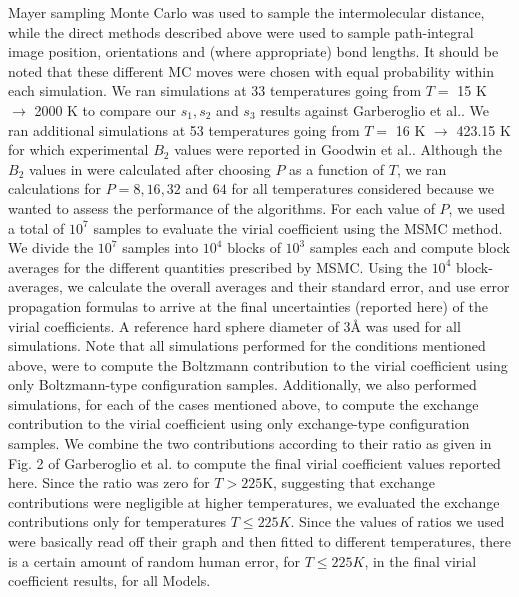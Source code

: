         Mayer sampling Monte Carlo was used to sample the intermolecular distance, while the direct methods described above were used to sample path-integral image position, orientations and (where appropriate) bond lengths. It should be noted that these different MC moves were chosen with equal probability within each simulation. We ran simulations at 33 temperatures going from $T =$ 15 K $\to$ 2000 K to compare our $s_1, s_2$ and $s_3$ results against Garberoglio et al.\cite{Garberoglio2014}. We ran additional simulations at 53 temperatures going from $T =$ 16 K $\to$ 423.15 K for which experimental $B_2$ values were reported in Goodwin et al.\cite{Goodwin1963}. Although the $B_2$ values in \cite{Garberoglio2014} were calculated after choosing $P$ as a function of $T$, we ran calculations for $P = 8, 16, 32$ and $64$ for all temperatures considered because we wanted to assess the performance of the algorithms. For each value of $P$, we used a total of $10^7$ samples to evaluate the virial coefficient using the MSMC\cite{Singh2004} method. We divide the $10^7$ samples into $10^4$ blocks of $10^3$ samples each and compute block averages for the different quantities prescribed by MSMC. Using the $10^4$ block-averages, we calculate the overall averages and their standard error, and use error propagation formulas to arrive at the final uncertainties (reported here) of the virial coefficients. A reference hard sphere diameter of 3{\AA} was used for all simulations.
        Note that all simulations performed for the conditions mentioned above, were to compute the Boltzmann contribution to the virial coefficient using only Boltzmann-type configuration samples. Additionally, we also performed simulations, for each of the cases mentioned above, to compute the exchange contribution to the virial coefficient using only exchange-type configuration samples. We combine the two contributions according to their ratio as given in Fig. 2 of Garberoglio et al. \cite{Garberoglio2014} to compute the final virial coefficient values reported here. Since the ratio was zero for $T > 225$K, suggesting that exchange contributions were negligible at higher temperatures, we evaluated the exchange contributions only for temperatures $T \le 225 K$. Since the values of ratios we used were basically read off their graph and then fitted to different temperatures, there is a certain amount of random human error, for $T \le 225 K$, in the final virial coefficient results, for all Models.
